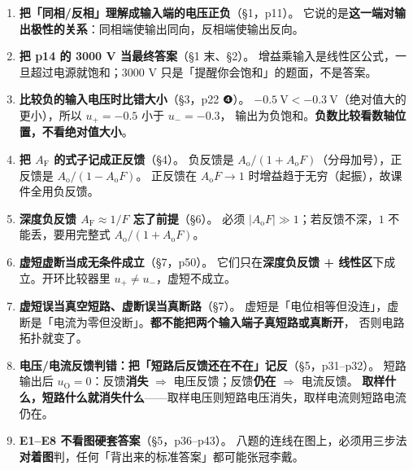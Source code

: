 \documentclass[11pt]{ctexart}
\begin{document}
\begin{enumerate}

\item \textbf{把「同相/反相」理解成输入端的电压正负}（§1，p11）。
它说的是\textbf{这一端对输出极性的关系}：同相端使输出同向，反相端使输出反向。

\item \textbf{把 p14 的 3000 V 当最终答案}（§1 末、§2）。
增益乘输入是线性区公式，一旦超过电源就饱和；3000 V 只是「提醒你会饱和」的题面，不是答案。

\item \textbf{比较负的输入电压时比错大小}（§3，p22 ❹）。
$-0.5\ \mathrm{V} < -0.3\ \mathrm{V}$（绝对值大的更小），所以 $u_+=-0.5$ 小于 $u_-=-0.3$，
输出为负饱和。\textbf{负数比较看数轴位置，不看绝对值大小}。

\item \textbf{把 $A_{\mathrm{F}}$ 的式子记成正反馈}（§4）。
负反馈是 $A_{\mathrm{o}}/(1+A_{\mathrm{o}}F)$（分母加号），正反馈是 $A_{\mathrm{o}}/(1-A_{\mathrm{o}}F)$。
正反馈在 $A_{\mathrm{o}}F\to1$ 时增益趋于无穷（起振），故课件全用负反馈。

\item \textbf{深度负反馈 $A_{\mathrm{F}}\approx1/F$ 忘了前提}（§6）。
必须 $|A_{\mathrm{o}}F|\gg1$；若反馈不深，$1$ 不能丢，要用完整式 $A_{\mathrm{o}}/(1+A_{\mathrm{o}}F)$。

\item \textbf{虚短虚断当成无条件成立}（§7，p50）。
它们只在\textbf{深度负反馈 + 线性区}下成立。开环比较器里 $u_+\neq u_-$，虚短不成立。

\item \textbf{虚短误当真空短路、虚断误当真断路}（§7）。
虚短是「电位相等但没连」，虚断是「电流为零但没断」。\textbf{都不能把两个输入端子真短路或真断开}，
否则电路拓扑就变了。

\item \textbf{电压/电流反馈判错：把「短路后反馈还在不在」记反}（§5，p31--p32）。
短路输出后 $u_{\mathrm{O}}=0$：反馈\textbf{消失} $\Rightarrow$ 电压反馈；反馈\textbf{仍在} $\Rightarrow$ 电流反馈。
\textbf{取样什么，短路什么就消失什么}——取样电压则短路电压消失，取样电流则短路电流仍在。

\item \textbf{E1--E8 不看图硬套答案}（§5，p36--p43）。
八题的连线在图上，必须用三步法\textbf{对着图}判，任何「背出来的标准答案」都可能张冠李戴。

\end{enumerate}

\end{document}
